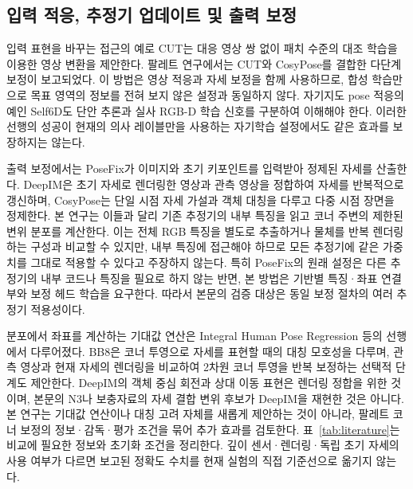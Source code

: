 \subsection{입력 적응, 추정기 업데이트 및 출력 보정}
입력 표현을 바꾸는 접근의 예로 CUT는 대응 영상 쌍 없이 패치 수준의 대조 학습을 이용한 영상 변환을 제안한다\cite{cut2020}. 팔레트 연구에서는 CUT와 CosyPose를 결합한 다단계 보정이 보고되었다\cite{elmoaqet2025}. 이 방법은 영상 적응과 자세 보정을 함께 사용하므로, 합성 학습만으로 목표 영역의 정보를 전혀 보지 않은 설정과 동일하지 않다. 자기지도 pose 적응의 예인 Self6D도 단안 추론과 실사 RGB-D 학습 신호를 구분하여 이해해야 한다\cite{self6d2020}. 이러한 선행의 성공이 현재의 의사 레이블만을 사용하는 자기학습 설정에서도 같은 효과를 보장하지는 않는다.

출력 보정에서는 PoseFix가 이미지와 초기 키포인트를 입력받아 정제된 자세를 산출한다\cite{posefix2019}. DeepIM은 초기 자세로 렌더링한 영상과 관측 영상을 정합하여 자세를 반복적으로 갱신하며\cite{deepim2018}, CosyPose는 단일 시점 자세 가설과 객체 대칭을 다루고 다중 시점 장면을 정제한다\cite{cosypose2020}. 본 연구는 이들과 달리 기존 추정기의 내부 특징을 읽고 코너 주변의 제한된 변위 분포를 계산한다. 이는 전체 RGB 특징을 별도로 추출하거나 물체를 반복 렌더링하는 구성과 비교할 수 있지만, 내부 특징에 접근해야 하므로 모든 추정기에 같은 가중치를 그대로 적용할 수 있다고 주장하지 않는다. 특히 PoseFix의 원래 설정은 다른 추정기의 내부 코드나 특징을 필요로 하지 않는 반면, 본 방법은 기반별 특징·좌표 연결부와 보정 헤드 학습을 요구한다. 따라서 본문의 검증 대상은 동일 보정 절차의 여러 추정기 적용성이다.

분포에서 좌표를 계산하는 기대값 연산은 Integral Human Pose Regression 등의 선행에서 다루어졌다\cite{integral2018}. BB8은 코너 투영으로 자세를 표현할 때의 대칭 모호성을 다루며, 관측 영상과 현재 자세의 렌더링을 비교하여 2차원 코너 투영을 반복 보정하는 선택적 단계도 제안한다\cite{bb82017}. DeepIM의 객체 중심 회전과 상대 이동 표현은 렌더링 정합을 위한 것이며, 본문의 N3나 보충자료의 자세 결합 변위 후보가 DeepIM을 재현한 것은 아니다. 본 연구는 기대값 연산이나 대칭 고려 자체를 새롭게 제안하는 것이 아니라, 팔레트 코너 보정의 정보·감독·평가 조건을 묶어 추가 효과를 검토한다. 표~\ref{tab:literature}는 비교에 필요한 정보와 초기화 조건을 정리한다. 깊이 센서·렌더링·독립 초기 자세의 사용 여부가 다르면 보고된 정확도 수치를 현재 실험의 직접 기준선으로 옮기지 않는다.
